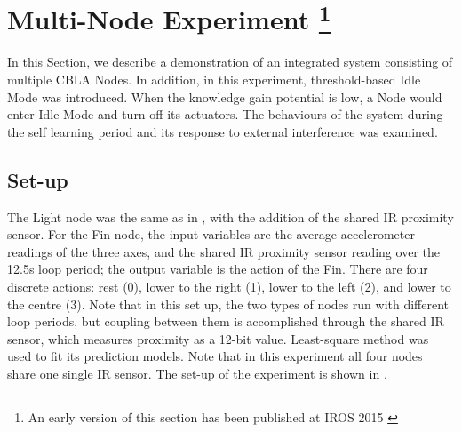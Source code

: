 \FloatBarrier

\section[Multi-Node Experiment]
{Multi-Node Experiment
	\footnote{An early version of this section has been published at IROS 2015 \cite{Chan2015} }}\label{sec:multi-node}


In this Section, we describe a demonstration of an integrated system consisting of multiple CBLA Nodes. In addition, in this experiment, threshold-based Idle Mode was introduced. When the knowledge gain potential is low, a Node would enter Idle Mode and turn off its actuators. The behaviours of the system during the self learning period and its response to external interference was examined.

\subsection{Set-up}
The Light node was the same as in , with the addition of the shared IR proximity sensor. For the Fin node, the input variables are the average accelerometer readings of the three axes, and the shared IR proximity sensor reading over the 12.5s loop period; the output variable is the action of the Fin. There are four discrete actions: rest (0), lower to the right (1), lower to the left (2), and lower to the centre (3). Note that in this set up, the two types of nodes run with different loop periods, but coupling between them is accomplished through the shared IR sensor, which measures proximity as a 12-bit value. Least-square method was used to fit its prediction models. Note that in this experiment all four nodes share one single IR sensor. The set-up of the experiment is shown in .

